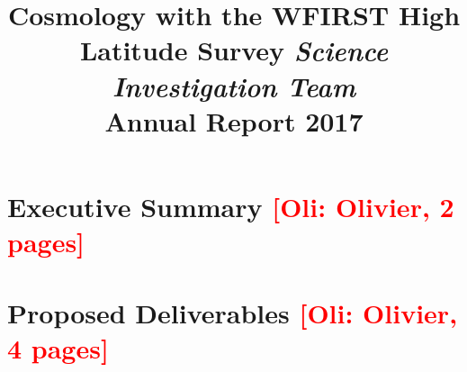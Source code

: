 \documentclass[letter]{ar-1col_WFIRST-HLS}
\newcommand{\Oli}[1]{\textcolor{red}{[{\bf Oli}: #1]}}
\begin{document}

\thispagestyle{empty}


\cleardoublepage



\title{Cosmology with the WFIRST High Latitude Survey \emph{Science Investigation Team}\\ Annual Report 2017}



\maketitle

\tableofcontents
\thispagestyle{empty}

\newpage
{}

\section{Executive Summary \Oli{Olivier, 2 pages}}
\label{sec:executive_summary}



\section{Proposed Deliverables \Oli{Olivier, 4 pages}}
\label{sec:deliverables}

\end{document}
